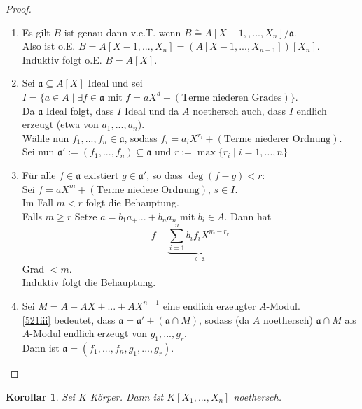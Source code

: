 \documentclass[10pt,a4paper]{article}
\newcommand{\isomorph}{\ensuremath{\overset{\sim}{=}}}
\newcounter{thm}[section]
\theoremstyle{definition}
\theoremstyle{plain}
\newtheorem{kor}[thm]{Korollar}
\theoremstyle{remark}
\begin{document}
\begin{proof}
	\begin{enumerate}
		\item Es gilt $B$ ist genau dann v.e.T. wenn $B\isomorph A[X-1,,...,X_n]/\mathfrak a$.\\
		Also ist o.E. $B=A[X-1,...,X_n]=(A[X-1,...,X_{n-1}])[X_n]$.\\
		Induktiv folgt o.E. $B=A[X]$.
		
		\item Sei $\mathfrak a\subseteq A[X]$ Ideal und sei \\
		$I=\{a\in A\mid\exists f\in\mathfrak a\text{ mit }f=aX^d+(\text{Terme niederen Grades})\}$.\\
		Da $\mathfrak a$ Ideal folgt, dass $I$ Ideal und da $A$ noethersch auch, dass $I$ endlich erzeugt (etwa von $a_1,...,a_n$).\\
		Wähle nun $f_1,...,f_n\in\mathfrak a$, sodass $f_i=a_iX^{r_i}+(\text{Terme niederer Ordnung})$.\\
		Sei nun $\mathfrak a':=(f_1,...,f_n)\subseteq \mathfrak a$ und $r:=\max\{r_i\mid i=1,...,n\}$
		
		\item \label{521iii}Für alle $f\in \mathfrak a$ existiert $g\in\mathfrak a'$, so dass $\deg(f-g)<r$:\\
		Sei $f=aX^m+(\text{Terme niedere Ordnung})$, $s\in I$.\\
		Im Fall $m<r$ folgt die Behauptung.\\
		Falls $m\geq r$ Setze $a=b_1a_+...+b_na_n$ mit $b_i\in A$. Dann hat
		\[f-\underbrace{\sum_{i=1}^{n}b_if_iX^{m-r_r}}_{\in\mathfrak a}\]
		Grad $<m$.\\
		Induktiv folgt die Behauptung.
		
		\item Sei $M=A+AX+...+AX^{n-1}$ eine endlich erzeugter $A$-Modul.\\
		\ref{521iii} bedeutet, dass $\mathfrak a=\mathfrak a'+(\mathfrak a\cap M)$, sodass (da $A$ noethersch) $\mathfrak a\cap M$ als $A$-Modul endlich erzeugt von $g_1,...,g_r$.\\
		Dann ist $\mathfrak a=(f_1,...,f_n,g_1,...,g_r)$.
	\end{enumerate}
\end{proof}

\begin{kor}\label{522kor}
	Sei $K$ Körper. Dann ist $K[X_1,...,X_n]$ noethersch.
\end{kor}
\end{document}

